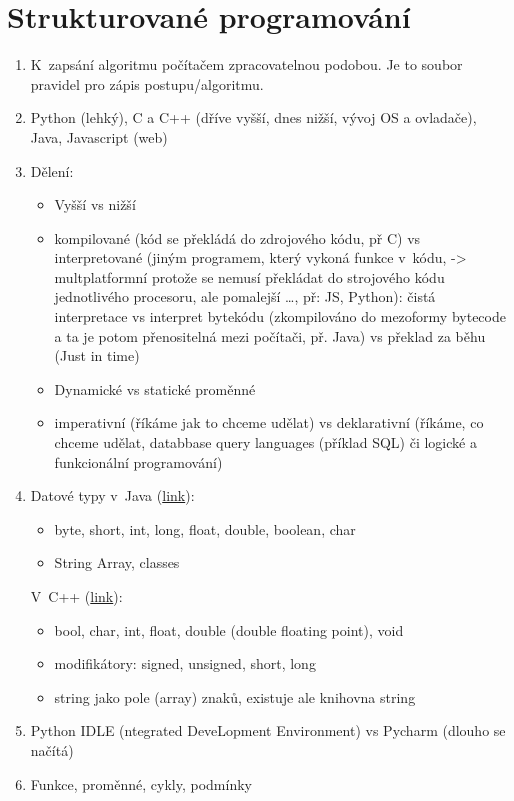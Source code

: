 \documentclass[12pt]{article}
\begin{document}
\section{Strukturované programování}
\label{sec:program_jazyk}
\begin{enumerate}
\item K~zapsání algoritmu počítačem zpracovatelnou podobou. Je to soubor pravidel pro zápis postupu/algoritmu.
\item Python (lehký), C a C++ (dříve vyšší, dnes nižší, vývoj OS a ovladače), Java, Javascript (web)
\item Dělení: 
\begin{itemize}
\item Vyšší vs nižší
\item kompilované (kód se překládá do zdrojového kódu, př C) vs interpretované (jiným programem, který vykoná funkce v~kódu, -> multplatformní protože se nemusí překládat do strojového kódu jednotlivého procesoru, ale pomalejší \dots, př: JS, Python): čistá interpretace vs interpret bytekódu (zkompilováno do mezoformy bytecode a ta je potom přenositelná mezi počítači, př. Java) vs překlad za běhu (Just in time)
\item Dynamické vs statické proměnné
\item imperativní (říkáme jak to chceme udělat) vs deklarativní (říkáme, co chceme udělat, databbase query languages (příklad SQL) či logické a funkcionální programování)
\end{itemize}
\item Datové typy v~Java (\href{https://www.w3schools.com/java/java_data_types.asp}{link}):
\begin{itemize}
\item  byte, short, int, long, float, double, boolean, char
\item  String Array, classes
\end{itemize}
V~C++ (\href{https://www.tutorialspoint.com/cplusplus/cpp_data_types.htm}{link}):
\begin{itemize}
\item bool, char, int,  float, double (double floating point), void
\item modifikátory: signed, unsigned, short, long
\item string jako pole (array) znaků, existuje ale knihovna string 
\end{itemize}
\item Python IDLE (ntegrated DeveLopment Environment) vs Pycharm (dlouho se načítá)
\item Funkce, proměnné, cykly, podmínky
\end{enumerate}
\end{document}
